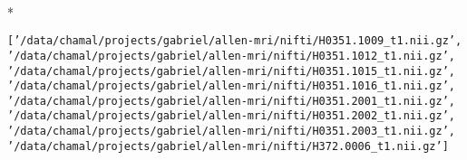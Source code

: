 \documentclass[letterpaper,10pt,english]{/usr/share/sphinx/texinputs/sphinxhowto}
\def\smaller{\fontsize{9.5pt}{9.5pt}\selectfont}
\newenvironment{InvisibleVerbatim}
        {\begin{mdframed}[leftmargin=0.1\linewidth,innerleftmargin=3pt,innerrightmargin=3pt, userdefinedwidth=1\linewidth, linewidth=0pt, linecolor=white, usetwoside=false]}
        {\end{mdframed}}
\begin{document}
        

            
                \makebox[0.1\linewidth]{\smaller\hfill\tt\color{nbframe-out-prompt}Out\hspace{4pt}{[}14{]}:\hspace{4pt}}\\*
                \vspace{-2.55\baselineskip}\begin{InvisibleVerbatim}
                \vspace{-0.5\baselineskip}
\begin{alltt}['/data/chamal/projects/gabriel/allen-mri/nifti/H0351.1009\_t1.nii.gz',
 '/data/chamal/projects/gabriel/allen-mri/nifti/H0351.1012\_t1.nii.gz',
 '/data/chamal/projects/gabriel/allen-mri/nifti/H0351.1015\_t1.nii.gz',
 '/data/chamal/projects/gabriel/allen-mri/nifti/H0351.1016\_t1.nii.gz',
 '/data/chamal/projects/gabriel/allen-mri/nifti/H0351.2001\_t1.nii.gz',
 '/data/chamal/projects/gabriel/allen-mri/nifti/H0351.2002\_t1.nii.gz',
 '/data/chamal/projects/gabriel/allen-mri/nifti/H0351.2003\_t1.nii.gz',
 '/data/chamal/projects/gabriel/allen-mri/nifti/H372.0006\_t1.nii.gz']\end{alltt}

            \end{InvisibleVerbatim}
            
        
    


\end{document}
